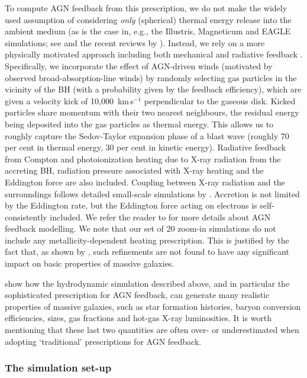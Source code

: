 \documentclass[fleqn,usenatbib]{mnras}
\begin{document}
To compute AGN feedback from this prescription, we 
do not make the widely used assumption of considering {\em only}
(spherical) thermal energy release into the ambient medium (as is the
case in, e.g., the  Illustris, Magneticum and EAGLE simulations; see
\citealt{Genel14, Hirschmann14,  Schaye15} and the recent reviews by
\citealt{Naab16, Somerville15}). Instead,  we rely on a more
physically motivated approach including both mechanical and radiative
feedback \citep{Ostriker10, Choi16}. Specifically, we incorporate 
the effect of  AGN-driven winds (motivated by observed 
broad-absorption-line winds) by randomly selecting gas particles in the
vicinity of the BH (with a probability given by  the  feedback
efficiency), which are given a velocity kick of 10,000~km\,s$^{-1}$
perpendicular to the gaseous disk. Kicked particles share momentum
with their two nearest neighbours, the residual energy being deposited
into the gas particles as thermal energy. This allows us to roughly
capture the Sedov-Taylor expansion phase of a blast wave (roughly 70
per  cent in thermal energy, 30 per cent in kinetic energy).  
%
Radiative feedback from Compton and photoionization heating due to 
X-ray radiation from the accreting BH, radiation pressure associated
with X-ray heating and the Eddington force are also included. 
Coupling between X-ray radiation and the surroundings follows 
detailed small-scale simulations by \citet{Sazonov05}. 
Accretion is not limited by the Eddington rate, but the Eddington
force acting on electrons is self-consistently included. We refer the
reader to \citet{Choi15, Choi16} for more details about AGN feedback
modelling. We note that our set of 20 zoom-in simulations do
not include any metallicity-dependent heating prescription. This is 
justified by the fact that, as shown by \citet{Choi16}, such
refinements are not found to have any significant impact on basic
properties of massive galaxies.

\citet{Choi16} show how the hydrodynamic simulation described 
above, and in particular the sophisticated prescription for AGN feedback,
can generate many realistic properties of massive galaxies, such as 
star formation histories, baryon conversion efficiencies, sizes, gas 
fractions and hot-gas X-ray luminosities. It is worth mentioning that 
these last two quantities are often over- or underestimated when 
adopting `traditional' prescriptions for AGN feedback.

\subsubsection{The simulation set-up}\label{setup}
\end{document}
